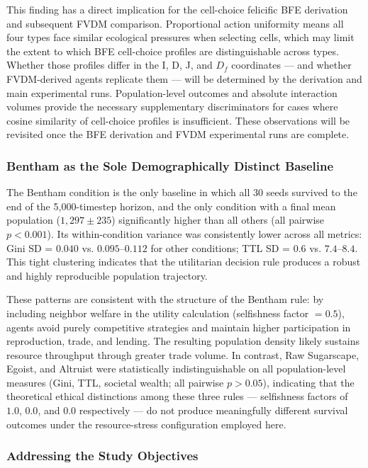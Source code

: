 \documentclass{icsthesis}
\begin{document}
\begin{mainmatter}
This finding has a direct implication for the cell-choice felicific BFE derivation and subsequent FVDM comparison. Proportional action uniformity means all four types face similar ecological pressures when selecting cells, which may limit the extent to which BFE cell-choice profiles are distinguishable across types. Whether those profiles differ in the I, D, J, and $D_f$ coordinates --- and whether FVDM-derived agents replicate them --- will be determined by the derivation and main experimental runs. Population-level outcomes and absolute interaction volumes provide the necessary supplementary discriminators for cases where cosine similarity of cell-choice profiles is insufficient. These observations will be revisited once the BFE derivation and FVDM experimental runs are complete.

\subsubsection{Bentham as the Sole Demographically Distinct Baseline}

The Bentham condition is the only baseline in which all 30 seeds survived to the end of the 5,000-timestep horizon, and the only condition with a final mean population ($1{,}297 \pm 235$) significantly higher than all others (all pairwise $p < 0.001$). Its within-condition variance was consistently lower across all metrics: Gini SD = $0.040$ vs. $0.095$--$0.112$ for other conditions; TTL SD = $0.6$ vs. $7.4$--$8.4$. This tight clustering indicates that the utilitarian decision rule produces a robust and highly reproducible population trajectory.

These patterns are consistent with the structure of the Bentham rule: by including neighbor welfare in the utility calculation (selfishness factor $= 0.5$), agents avoid purely competitive strategies and maintain higher participation in reproduction, trade, and lending. The resulting population density likely sustains resource throughput through greater trade volume. In contrast, Raw Sugarscape, Egoist, and Altruist were statistically indistinguishable on all population-level measures (Gini, TTL, societal wealth; all pairwise $p > 0.05$), indicating that the theoretical ethical distinctions among these three rules — selfishness factors of $1.0$, $0.0$, and $0.0$ respectively — do not produce meaningfully different survival outcomes under the resource-stress configuration employed here.

\subsubsection{Addressing the Study Objectives}


\end{mainmatter}
\end{document}

